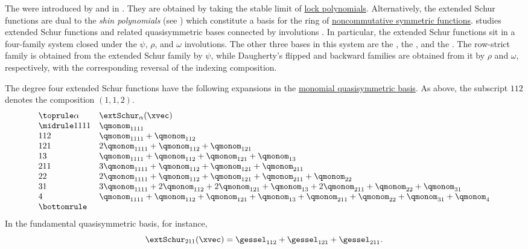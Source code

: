 The \label{extendedSchurFunction} were
introduced by 
and  in \cite{AssafSearles2019}.
They are obtained by taking the stable limit of
\hyperref[lockPolynomialDefinition]{lock polynomials}.
Alternatively, the extended Schur functions are dual
to the \emph{shin polynomials} (see \cite{CampbellFeldmanLightShuldinerXu2014})
which constitute a basis for the ring of
\hyperref[nonComFunctions]{noncommutative symmetric functions}.
 studies extended Schur functions and related
quasisymmetric bases connected by involutions \cite{Daugherty2024Extended}.
In particular, the extended Schur functions sit in a four-family system closed
under the $\psi$, $\rho$, and $\omega$ involutions.
The other three bases in this system are the
\label{rowStrictExtendedSchurFunction},
the \label{flippedExtendedSchurFunction},
and the \label{backwardExtendedSchurFunction}.
The row-strict family is obtained
from the extended Schur family by $\psi$, while Daugherty's flipped and
backward families are obtained from it by $\rho$ and $\omega$, respectively,
with the corresponding reversal of the indexing composition.

The degree four extended Schur functions have the following expansions in the
\hyperref[qmonom]{monomial quasisymmetric basis}.  As above, the subscript
$112$ denotes the composition $(1,1,2)$.
\[
\begin{array}{ll}
\toprule
\alpha & \extSchur_\alpha(\xvec) \\
\midrule
1111 & \qmonom_{1111} \\
112  & \qmonom_{1111}+\qmonom_{112} \\
121  & 2\qmonom_{1111}+\qmonom_{112}+\qmonom_{121} \\
13   & \qmonom_{1111}+\qmonom_{112}+\qmonom_{121}+\qmonom_{13} \\
211  & 3\qmonom_{1111}+\qmonom_{112}+\qmonom_{121}+\qmonom_{211} \\
22   & 2\qmonom_{1111}+\qmonom_{112}+\qmonom_{121}
       +\qmonom_{211}+\qmonom_{22} \\
31   & 3\qmonom_{1111}+2\qmonom_{112}+2\qmonom_{121}
       +\qmonom_{13}+2\qmonom_{211}+\qmonom_{22}+\qmonom_{31} \\
4    & \qmonom_{1111}+\qmonom_{112}+\qmonom_{121}+\qmonom_{13}
       +\qmonom_{211}+\qmonom_{22}+\qmonom_{31}+\qmonom_{4} \\
\bottomrule
\end{array}
\]
In the fundamental quasisymmetric basis, for instance,
\[
 \extSchur_{211}(\xvec)
 =
 \gessel_{112}+\gessel_{121}+\gessel_{211}.
\]

